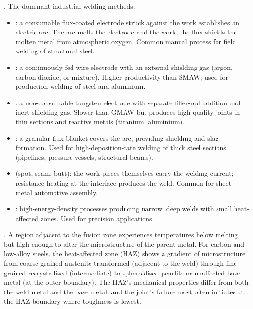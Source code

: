 . The dominant industrial welding methods:

\begin{itemize}[leftmargin=*]
\item {}: a consumable
  flux-coated electrode struck against the work establishes an
  electric arc. The arc melts the electrode and the work; the flux
  shields the molten metal from atmospheric oxygen. Common manual
  process for field welding of structural steel.
\item {}: a continuously fed
  wire electrode with an external shielding gas (argon, carbon
  dioxide, or mixture). Higher productivity than SMAW; used for
  production welding of steel and aluminium.
\item {}: a non-consumable
  tungsten electrode with separate filler-rod addition and inert
  shielding gas. Slower than GMAW but produces high-quality joints in
  thin sections and reactive metals (titanium, aluminium).
\item {}: a granular flux blanket
  covers the arc, providing shielding and slag formation. Used for
  high-deposition-rate welding of thick steel sections (pipelines,
  pressure vessels, structural beams).
\item {} (spot, seam, butt): the work pieces
  themselves carry the welding current; resistance heating at the
  interface produces the weld. Common for sheet-metal automotive
  assembly.
\item {}: high-energy-density
  processes producing narrow, deep welds with small heat-affected
  zones. Used for precision applications.
\end{itemize}

. A region adjacent to the fusion
zone experiences temperatures below melting but high enough to alter
the microstructure of the parent metal. For carbon and low-alloy
steels, the heat-affected zone (HAZ) shows a gradient of
microstructure from coarse-grained austenite-transformed (adjacent
to the weld) through fine-grained recrystallised (intermediate) to
spheroidised pearlite or unaffected base metal (at the outer
boundary). The HAZ's mechanical properties differ from both the
weld metal and the base metal, and the joint's failure most often
initiates at the HAZ boundary where toughness is lowest.

